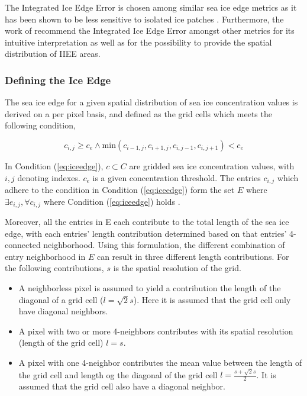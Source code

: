 \documentclass[../main/thesis.tex]{subfiles}
\begin{document}
The Integrated Ice Edge Error is chosen among similar sea ice edge metrics \citep{Melsom2019, Dukhovskoy2015} as it has been shown to be less sensitive to isolated ice patches \citep{Palerme2019}. Furthermore, the work of \citet{Melsom2019} recommend the Integrated Ice Edge Error amongst other metrics for its intuitive interpretation as well as for the possibility to provide the spatial distribution of IIEE areas.

\subsubsection{Defining the Ice Edge}
\label{sec:iceedgelength}
The sea ice edge for a given spatial distribution of sea ice concentration values is derived on a per pixel basis, and defined as the grid cells which meets the following condition,

\begin{equation}
    \label{eq:iceedge}
    c_{i,j} \geq c_e \wedge \text{min}{(c_{i-1,j},c_{i+1,j},c_{i,j-1},c_{i,j+1})} < c_e
\end{equation}

In Condition (\ref{eq:iceedge}), $c \subset C$ are gridded sea ice concentration values, with $i,j$ denoting indexes. $c_e$ is a given concentration threshold. The entries $c_{i,j}$ which adhere to the condition in Condition (\ref{eq:iceedge}) form the set $E$ where $\exists e_{i,j}, \forall c_{i,j}$ where Condition (\ref{eq:iceedge}) holds \citep{Melsom2019}.

Moreover, all the entries in E each contribute to the total length of the sea ice edge, with each entries' length contribution determined based on that entries' 4-connected neighborhood. Using this formulation, the different combination of entry neighborhood in $E$ can result in three different length contributions. For the following contributions, $s$ is the spatial resolution of the grid.

\begin{itemize}
    \item A neighborless pixel is assumed to yield a contribution the length of the diagonal of a grid cell ($l = \sqrt2s$). Here it is assumed that the grid cell only have diagonal neighbors.
    \item A pixel with two or more 4-neighbors contributes with its spatial resolution (length of the grid cell) $l = s$.
    \item A pixel with one 4-neighbor contributes the mean value between the length of the grid cell and length og the diagonal of the grid cell $l = \frac{s + \sqrt2s}{2}$. It is assumed that the grid cell also have a diagonal neighbor.
\end{itemize}
\end{document}

